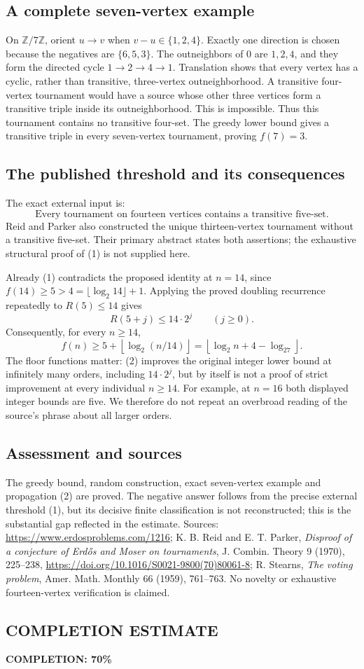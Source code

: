 \subsection*{A complete seven-vertex example}
On $\mathbb Z/7\mathbb Z$, orient $u\to v$ when
$v-u\in\{1,2,4\}$. Exactly one direction is chosen because the negatives are $\{6,5,3\}$.
The outneighbors of $0$ are $1,2,4$, and they form the directed cycle
$1\to2\to4\to1$. Translation shows that every vertex has a cyclic, rather than transitive, three-vertex outneighborhood.
A transitive four-vertex tournament would have a source whose other three vertices form a transitive triple inside its outneighborhood. This is impossible. Thus this tournament contains no transitive four-set. The greedy lower bound gives a transitive triple in every seven-vertex tournament, proving $f(7)=3$.

\subsection*{The published threshold and its consequences}
The exact external input is:
\[
 \text{Every tournament on fourteen vertices contains a transitive five-set.}
 \tag{1}
\]
Reid and Parker also constructed the unique thirteen-vertex tournament without a transitive five-set. Their primary abstract states both assertions; the exhaustive structural proof of (1) is not supplied here.

Already (1) contradicts the proposed identity at $n=14$, since
$f(14)\ge5>4=\lfloor\log_2 14\rfloor+1$.
Applying the proved doubling recurrence repeatedly to $R(5)\le14$ gives
\[
 R(5+j)\le14\cdot2^j\qquad(j\ge0).
\]
Consequently, for every $n\ge14$,
\[
 f(n)\ge5+\left\lfloor\log_2(n/14)\right\rfloor
       =\left\lfloor\log_2n+4-\log_27\right\rfloor.
 \tag{2}
\]
The floor functions matter: (2) improves the original integer lower bound at infinitely many orders, including $14\cdot2^j$, but by itself is not a proof of strict improvement at every individual $n\ge14$. For example, at $n=16$ both displayed integer bounds are five. We therefore do not repeat an overbroad reading of the source's phrase about all larger orders.

\subsection*{Assessment and sources}
The greedy bound, random construction, exact seven-vertex example and propagation (2) are proved. The negative answer follows from the precise external threshold (1), but its decisive finite classification is not reconstructed; this is the substantial gap reflected in the estimate.
Sources: \url{https://www.erdosproblems.com/1216}; K. B. Reid and E. T. Parker, \emph{Disproof of a conjecture of Erd\H{o}s and Moser on tournaments}, J. Combin. Theory 9 (1970), 225--238, \url{https://doi.org/10.1016/S0021-9800(70)80061-8}; R. Stearns, \emph{The voting problem}, Amer. Math. Monthly 66 (1959), 761--763. No novelty or exhaustive fourteen-vertex verification is claimed.
\subsection*{COMPLETION ESTIMATE}
\textbf{COMPLETION: 70\%}
